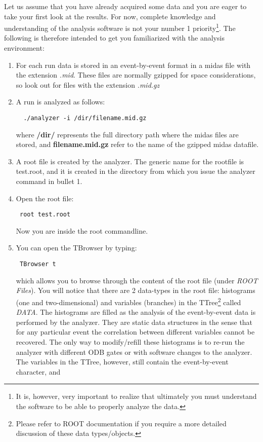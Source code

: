 \documentclass[11pt]{report}
\begin{document}
Let us assume that you have already acquired some data and you are eager to take your first look at the results.
For now, complete knowledge and understanding of the analysis software is not your number 1 
priority\footnote{ 
It is, however, very important to realize that ultimately you must understand the software to be
able to properly analyze the data.}.
The following is therefore intended to get you familiarized with the analysis environment:
\begin{enumerate}
\item For each run data is stored in an event-by-event format in a midas file with the extension {\it .mid}.
These files are normally gzipped for space considerations, so look out for files with the extension {\it .mid.gz}
\item A run is analyzed as follows:
\begin{verbatim}  ./analyzer -i /dir/filename.mid.gz  \end{verbatim}
where {\bf /dir/} represents the full directory path where the midas files are stored,
and {\bf filename.mid.gz} refer to the name of the gzipped midas datafile.
\item A root file is created by the analyzer. The generic name for the rootfile is test.root, and it
is created in the directory from which you issue the analyzer command in bullet 1.
\item Open the root file:
\begin{verbatim} root test.root \end{verbatim}
Now you are inside the root commandline.
\item You can open the TBrowser by typing:
\begin{verbatim} TBrowser t \end{verbatim}
which allows you to browse through the content of the root file (under {\it ROOT Files}). 
You will notice that there are 2 data-types in the root file: histograms (one and two-dimensional)
and variables (branches) in the TTree\footnote{Please refer to ROOT documentation if
you require a more detailed discussion of these data types/objects.} called {\it DATA}.
The histograms are filled as the analysis of the event-by-event data is performed
by the analyzer. They are static data structures in the sense that
for any particular event the correlation between different variables cannot be recovered.
The only way to modify/refill these histograms is to re-run the analyzer
with different ODB gates or with software changes to the analyzer.
The variables in the TTree, however, still contain the event-by-event character, and

\end{enumerate}
\end{document}
